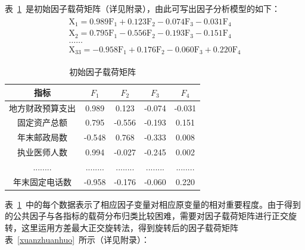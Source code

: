 \documentclass{whutmod}
\begin{document}
	表~\ref{cehngfenjuzheng}~是初始因子载荷矩阵（详见附录），由此可写出因子分析模型的如下：
	\begin{gather}
	\begin{array} { l } { \mathrm { X } _ { 1 } = 0.989 \mathrm { F } _ { 1 } + 0.123 \mathrm { F } _ { 2 } - 0.074 \mathrm { F } _ { 3 } - 0.031 \mathrm { F } _ { 4 } } \\ { \mathrm { X } _ { 2 } = 0.795 \mathrm { F } _ { 1 } - 0.556 \mathrm { F } _ { 2 } - 0.193 \mathrm { F } _ { 3 } - 0.151 \mathrm { F } _ { 4 } } \\ { \ldots \ldots } \\ { \mathrm { X } _ { 33 } = - 0.958 \mathrm { F } _ { 1 } + 0.176 \mathrm { F } _ { 2 } - 0.060 \mathrm { F } _ { 3 } + 0.220 \mathrm { F } _ { 4 } } \end{array}
	\end{gather}
			\begin{table}[H]
	\centering
	\caption{初始因子载荷矩阵}\label{cehngfenjuzheng}
	\begin{tabular}{ccccc}
		\toprule[2pt]
		\multicolumn{1}{m{2cm}}{\centering 指标} &
		\multicolumn{1}{m{1cm}}{\centering $F_{1}$} & \multicolumn{1}{m{1cm}}{\centering $F_{2}$} & \multicolumn{1}{m{1cm}}{\centering $F_{3}$}&
		\multicolumn{1}{m{1cm}}{\centering $F_{4}$}\\
		\midrule[1pt]
		地方财政预算支出&0.989	 & 0.123 & -0.074&-0.031\\ 
		固定资产总额&0.795 &-0.556 &-0.193&0.151\\ 
		年末邮政局数&-0.548 &0.768  &-0.333&0.008\\ 
		执业医师人数&0.994 &-0.027 &-0.245 &0.002\\ 
		........& ........&  ........ &........ &........ \\ 
		年末固定电话数&-0.958 &-0.176   &-0.060 &0.220 \\
		\bottomrule[2pt]
	\end{tabular}
\end{table}
		表~\ref{cehngfenjuzheng}~中的每个数据表示了相应因子变量对相应原变量的相对重要程度。由于得到的公共因子与各指标的载荷分布归类比较困难，需要对因子载荷矩阵进行正交旋转，这里运用方差最大正交旋转法\cite{宋鸿2010城市人才吸引力的影响因素及提升对策}，得到旋转后的因子载荷矩阵表~\ref{xuanzhuanhuo}~所示（详见附录）：
\end{document}
